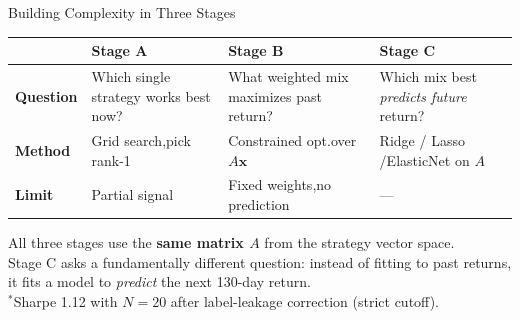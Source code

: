 \documentclass[aspectratio=169]{beamer}
\begin{document}
\begin{frame}{Building Complexity in Three Stages}

\small
\begin{tabular}{p{1.4cm}p{3.6cm}p{3.6cm}p{3.6cm}}
  \toprule
  & \textbf{Stage A} & \textbf{Stage B} & \textbf{Stage C} \\
  \midrule
  \textbf{Question}
    & Which single strategy works best now?
    & What weighted mix maximizes past return?
    & Which mix best \emph{predicts future} return? \\[0.3em]
  \textbf{Method}
    & Grid search,\newline pick rank-1
    & Constrained opt.\newline over $A\mathbf{x}$
    & Ridge / Lasso /\newline ElasticNet on $A$ \\[0.3em]
  \textbf{Limit}
    & Partial signal
    & Fixed weights,\newline no prediction
    & --- \\
  \bottomrule
\end{tabular}

\normalsize
\vspace{0.5em}
All three stages use the \textbf{same matrix $A$} from the strategy vector space.\\[0.3em]
Stage C asks a fundamentally different question: instead of fitting to past returns,
it fits a model to \emph{predict} the next 130-day return.\\[0.2em]
{\footnotesize $^*$Sharpe 1.12 with $N=20$ after label-leakage correction (strict cutoff).}

\end{frame}
\end{document}
